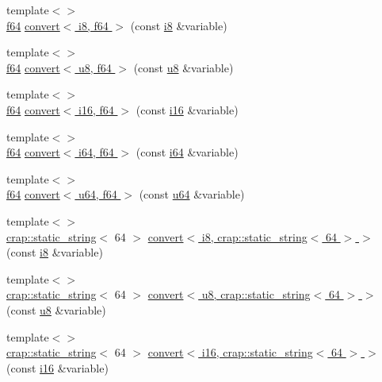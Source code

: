 \begin{DoxyCompactItemize}
\item 
{\footnotesize template$<$$>$ }\\\hyperlink{types_8h_a76c9f53497f766e57b184bc8a93ab73f}{f64} \hyperlink{namespacecrap_a347465d1b9c6cdce58b0d86487c57d6d}{convert$<$ i8, f64 $>$} (const \hyperlink{types_8h_ae3702327b5f47e83b431e22b33da7b58}{i8} \&variable)
\item 
{\footnotesize template$<$$>$ }\\\hyperlink{types_8h_a76c9f53497f766e57b184bc8a93ab73f}{f64} \hyperlink{namespacecrap_acdea740f660c9240f25ba2adf02f4c8c}{convert$<$ u8, f64 $>$} (const \hyperlink{types_8h_a92c50087ca0e64fa93fc59402c55f8ca}{u8} \&variable)
\item 
{\footnotesize template$<$$>$ }\\\hyperlink{types_8h_a76c9f53497f766e57b184bc8a93ab73f}{f64} \hyperlink{namespacecrap_a772f98902f1345d960ea92048d442d4f}{convert$<$ i16, f64 $>$} (const \hyperlink{types_8h_ad309dbcaeea13aa602d686964156ea0b}{i16} \&variable)
\item 
{\footnotesize template$<$$>$ }\\\hyperlink{types_8h_a76c9f53497f766e57b184bc8a93ab73f}{f64} \hyperlink{namespacecrap_aca1c9341b0b291b606b5206c7c23cf0b}{convert$<$ i64, f64 $>$} (const \hyperlink{types_8h_a85cb35fbe5bf2961d7ad5f26814a91a2}{i64} \&variable)
\item 
{\footnotesize template$<$$>$ }\\\hyperlink{types_8h_a76c9f53497f766e57b184bc8a93ab73f}{f64} \hyperlink{namespacecrap_a050021e1cea1d66973218d5f546cf4fe}{convert$<$ u64, f64 $>$} (const \hyperlink{types_8h_a3f7e2bcbb0b4c338f3c4f6c937cd4234}{u64} \&variable)
\item 
{\footnotesize template$<$$>$ }\\\hyperlink{classcrap_1_1static__string}{crap\-::static\-\_\-string}$<$ 64 $>$ \hyperlink{namespacecrap_add96d462b58504a6a376743b3e4d2ee1}{convert$<$ i8, crap\-::static\-\_\-string$<$ 64 $>$ $>$} (const \hyperlink{types_8h_ae3702327b5f47e83b431e22b33da7b58}{i8} \&variable)
\item 
{\footnotesize template$<$$>$ }\\\hyperlink{classcrap_1_1static__string}{crap\-::static\-\_\-string}$<$ 64 $>$ \hyperlink{namespacecrap_a3d6b06c8b3f4a795db98e0c9241a108d}{convert$<$ u8, crap\-::static\-\_\-string$<$ 64 $>$ $>$} (const \hyperlink{types_8h_a92c50087ca0e64fa93fc59402c55f8ca}{u8} \&variable)
\item 
{\footnotesize template$<$$>$ }\\\hyperlink{classcrap_1_1static__string}{crap\-::static\-\_\-string}$<$ 64 $>$ \hyperlink{namespacecrap_a5e19290e4ba008466410d136cf115a71}{convert$<$ i16, crap\-::static\-\_\-string$<$ 64 $>$ $>$} (const \hyperlink{types_8h_ad309dbcaeea13aa602d686964156ea0b}{i16} \&variable)

\end{DoxyCompactItemize}
